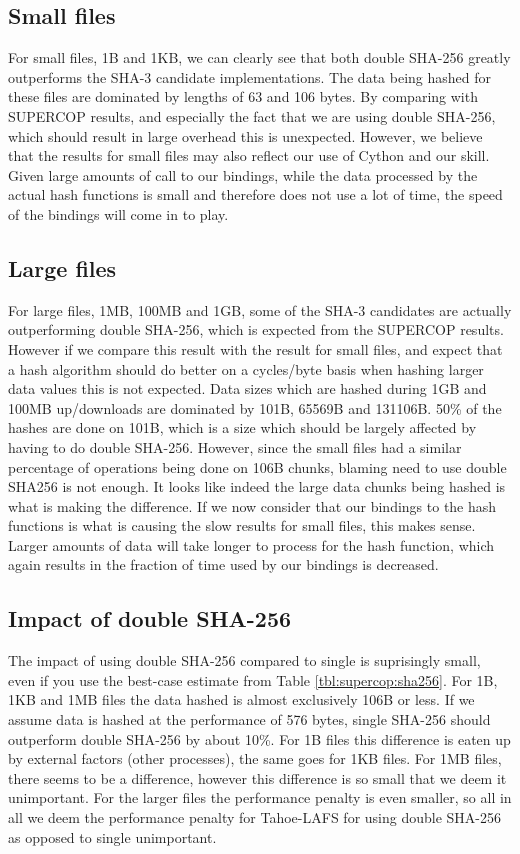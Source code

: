\documentclass[english,12pt,a4paper]{book}
\begin{document}
\subsection{Small files}
For small files, 1B and 1KB, we can clearly see that both double \ac{SHA}-256 
greatly outperforms the \ac{SHA}-3 candidate implementations. The data being 
hashed for these files are dominated by lengths of 63 and 106 bytes. By 
comparing with \ac{SUPERCOP} results, and especially the fact that we are 
using double \ac{SHA}-256, which should result in large overhead this is
unexpected. However, we believe that the results for small files may also
reflect our use of Cython and our skill. Given large amounts of call to our
bindings, while the data processed by the actual hash functions is small and
therefore does not use a lot of time, the speed of the bindings will come in to
play.

\subsection{Large files}
For large files, 1MB, 100MB and 1GB, some of the \ac{SHA}-3 candidates are 
actually outperforming double \ac{SHA}-256, which is expected from the
\ac{SUPERCOP} results. However if we compare this result with the result for
small files, and expect that a hash algorithm should do better on a cycles/byte
basis when hashing larger data values this is not expected. Data sizes which
are hashed during 1GB and 100MB up/downloads are dominated by 101B, 65569B and
131106B. 50\% of the hashes are done on 101B, which is a size which should be
largely affected by having to do double SHA-256. However, since the small files
had a similar percentage of operations being done on 106B chunks, blaming need
to use double \ac{SHA}256 is not enough. It looks like indeed the large data
chunks being hashed is what is making the difference. If we now consider that
our bindings to the hash functions is what is causing the slow results for
small files, this makes sense. Larger amounts of data will take longer to
process for the hash function, which again results in the fraction of time used
by our bindings is decreased.


\subsection{Impact of double \ac{SHA}-256}
The impact of using double \ac{SHA}-256 compared to single is suprisingly
small, even if you use the best-case estimate from Table
\ref{tbl:supercop:sha256}. For 1B, 1KB and 1MB files the data hashed is almost
exclusively 106B or less. If we assume data is hashed at the performance of 576
bytes, single \ac{SHA}-256 should outperform double \ac{SHA}-256 by about 10\%.
For 1B files this difference is eaten up by external factors (other
processes), the same goes for 1KB files. For 1MB files, there seems to be a
difference, however this difference is so small that we deem it unimportant.
For the larger files the performance penalty is even smaller, so all in all we
deem the performance penalty for Tahoe-\ac{LAFS} for using double \ac{SHA}-256
as opposed to single unimportant.
\end{document}
